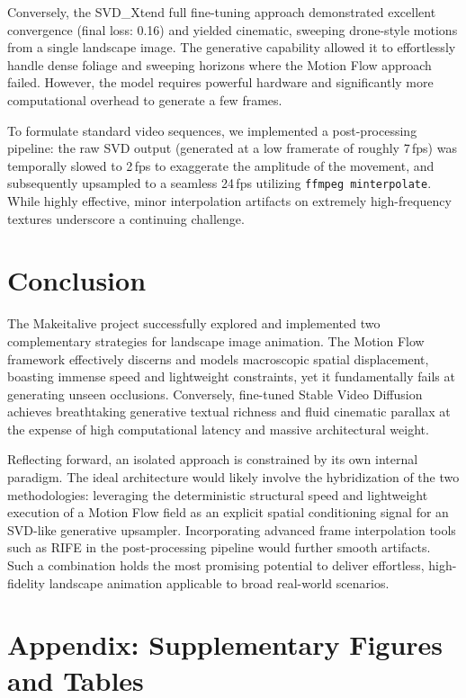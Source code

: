 \documentclass[10pt,twocolumn,letterpaper]{article}
\begin{document}
Conversely, the SVD\_Xtend full fine-tuning approach demonstrated excellent convergence (final loss: 0.16) and yielded cinematic, sweeping drone-style motions from a single landscape image. The generative capability allowed it to effortlessly handle dense foliage and sweeping horizons where the Motion Flow approach failed. However, the model requires powerful hardware and significantly more computational overhead to generate a few frames.

To formulate standard video sequences, we implemented a post-processing pipeline: the raw SVD output (generated at a low framerate of roughly 7\,fps) was temporally slowed to 2\,fps to exaggerate the amplitude of the movement, and subsequently upsampled to a seamless 24\,fps utilizing \texttt{ffmpeg minterpolate}. While highly effective, minor interpolation artifacts on extremely high-frequency textures underscore a continuing challenge.

\section{Conclusion}

The Makeitalive project successfully explored and implemented two complementary strategies for landscape image animation. The Motion Flow framework effectively discerns and models macroscopic spatial displacement, boasting immense speed and lightweight constraints, yet it fundamentally fails at generating unseen occlusions. Conversely, fine-tuned Stable Video Diffusion achieves breathtaking generative textual richness and fluid cinematic parallax at the expense of high computational latency and massive architectural weight. 

Reflecting forward, an isolated approach is constrained by its own internal paradigm. The ideal architecture would likely involve the hybridization of the two methodologies: leveraging the deterministic structural speed and lightweight execution of a Motion Flow field as an explicit spatial conditioning signal for an SVD-like generative upsampler. Incorporating advanced frame interpolation tools such as RIFE in the post-processing pipeline would further smooth artifacts. Such a combination holds the most promising potential to deliver effortless, high-fidelity landscape animation applicable to broad real-world scenarios.

\clearpage
\appendix
\section{Appendix: Supplementary Figures and Tables}
\end{document}

